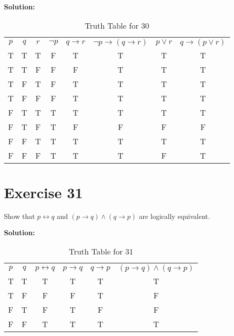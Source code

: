 \documentclass{Axon}
\begin{document}
\noindent
\textbf{Solution:}
\begin{table}[ht]
    \centering
    \begin{tabular}{c|c|c|c|c|c|c|c}
        \(p\) & \(q\) & \(r\) & \(\lnot p\) & \(q \to r\) & \(\lnot p \to (q \to r)\) & \(p \lor r\) & \(q \to (p \lor r)\) \\
        T     & T     & T     & F           & T           & T                         & T            & T                    \\
        T     & T     & F     & F           & F           & T                         & T            & T                    \\
        T     & F     & T     & F           & T           & T                         & T            & T                    \\
        T     & F     & F     & F           & T           & T                         & T            & T                    \\
        F     & T     & T     & T           & T           & T                         & T            & T                    \\
        F     & T     & F     & T           & F           & F                         & F            & F                    \\
        F     & F     & T     & T           & T           & T                         & T            & T                    \\
        F     & F     & F     & T           & T           & T                         & F            & T
    \end{tabular}
    \caption{Truth Table for 30}
\end{table}

\section*{Exercise 31}
Show that \(p \leftrightarrow q\) and \((p \to q) \land (q \to p)\) are logically equivalent.

\noindent
\textbf{Solution:}
\begin{table}[ht]
    \centering
    \begin{tabular}{c|c|c|c|c|c}
        \(p\) & \(q\) & \(p \leftrightarrow q\) & \(p \to q\) & \(q \to p\) & \((p \to q) \land (q \to p)\) \\
        T     & T     & T                       & T           & T           & T                             \\
        T     & F     & F                       & F           & T           & F                             \\
        F     & T     & F                       & T           & F           & F                             \\
        F     & F     & T                       & T           & T           & T
    \end{tabular}
    \caption{Truth Table for 31}
\end{table}
\end{document}
